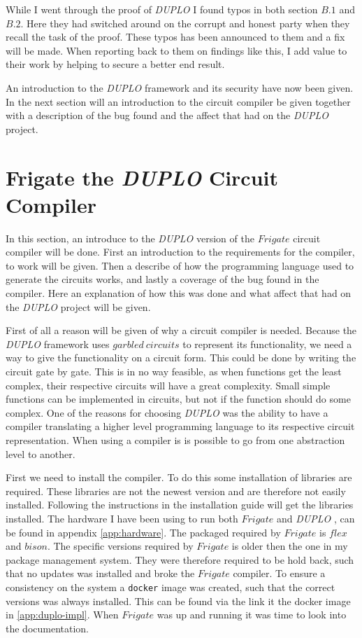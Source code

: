 \documentclass[twoside,11pt,openright]{report}
\newcommand{\DUPLO}{\textit{DUPLO} }
\begin{document}
\bigskip

While I went through the proof of \DUPLO I found typos in both section $B.1$ and $B.2$. Here they had switched around on the corrupt and honest party when they recall the task of the proof. These typos has been announced to them and a fix will be made. When reporting back to them on findings like this, I add value to their work by helping to secure a better end result.

\bigskip

An introduction to the \DUPLO framework and its security have now been given. In the next section will an introduction to the circuit compiler be given together with a description of the bug found and the affect that had on the \DUPLO project.

\section{Frigate the \DUPLO Circuit Compiler}
\label{sec:frigate}
In this section, an introduce to the \DUPLO version of the $Frigate$ circuit compiler will be done. First an introduction to the requirements for the compiler, to work will be given. Then a describe of how the programming language used to generate the circuits works, and lastly a coverage of the bug found in the compiler. Here an explanation of how this was done and what affect that had on the \DUPLO project will be given.

First of all a reason will be given of why a circuit compiler is needed. Because the \DUPLO framework uses $garbled~circuits$ to represent its functionality, we need a way to give the functionality on a circuit form. This could be done by writing the circuit gate by gate. This is in no way feasible, as when functions get the least complex, their respective circuits will have a great complexity. Small simple functions can be implemented in circuits, but not if the function should do some complex. One of the reasons for choosing \DUPLO was the ability to have a compiler translating a higher level programming language to its respective circuit representation. When using a compiler is is possible to go from one abstraction level to another.

First we need to install the compiler. To do this some installation of libraries are required. These libraries are not the newest version and are therefore not easily installed. Following the instructions in the installation guide will get the libraries installed. The hardware I have been using to run both $Frigate$ and \DUPLO, can be found in appendix \ref{app:hardware}. The packaged required by $Frigate$ is $flex$ and $bison$. The specific versions required by $Frigate$ is older then the one in my package management system. They were therefore required to be hold back, such that no updates was installed and broke the $Frigate$ compiler. To ensure a consistency on the system a \verb|docker| image was created, such that the correct versions was always installed. This can be found via the link it the docker image in \ref{app:duplo-impl}. When $Frigate$ was up and running it was time to look into the documentation.
\end{document}
